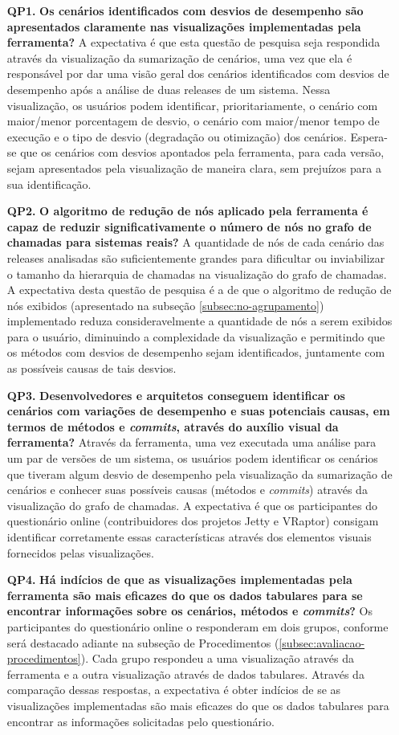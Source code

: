 \begin{itemize}
  \item[\textbf{QP1.}] \textbf{Os cenários identificados com desvios de desempenho são apresentados claramente nas visualizações implementadas pela ferramenta?} A expectativa é que esta questão de pesquisa seja respondida através da visualização da sumarização de cenários, uma vez que ela é responsável por dar uma visão geral dos cenários identificados com desvios de desempenho após a análise de duas releases de um sistema. Nessa visualização, os usuários podem identificar, prioritariamente, o cenário com maior/menor porcentagem de desvio, o cenário com maior/menor tempo de execução e o tipo de desvio (degradação ou otimização) dos cenários. Espera-se que os cenários com desvios apontados pela ferramenta, para cada versão, sejam apresentados pela visualização de maneira clara, sem prejuízos para a sua identificação.
  \item[\textbf{QP2.}] \textbf{O algoritmo de redução de nós aplicado pela ferramenta é capaz de reduzir significativamente o número de nós no grafo de chamadas para sistemas reais?} A quantidade de nós de cada cenário das releases analisadas são suficientemente grandes para dificultar ou inviabilizar o tamanho da hierarquia de chamadas na visualização do grafo de chamadas. A expectativa desta questão de pesquisa é a de que o algoritmo de redução de nós exibidos (apresentado na subseção \ref{subsec:no-agrupamento}) implementado reduza consideravelmente a quantidade de nós a serem exibidos para o usuário, diminuindo a complexidade da visualização e permitindo que os métodos com desvios de desempenho sejam identificados, juntamente com as possíveis causas de tais desvios. 
  \item[\textbf{QP3.}] \textbf{Desenvolvedores e arquitetos conseguem identificar os cenários com variações de desempenho e suas potenciais causas, em termos de métodos e \textit{commits}, através do auxílio visual da ferramenta?} Através da ferramenta, uma vez executada uma análise para um par de versões de um sistema, os usuários podem identificar os cenários que tiveram algum desvio de desempenho pela visualização da sumarização de cenários e conhecer suas possíveis causas (métodos e \textit{commits}) através da visualização do grafo de chamadas. A expectativa é que os participantes do questionário online (contribuidores dos projetos Jetty e VRaptor) consigam identificar corretamente essas características através dos elementos visuais fornecidos pelas visualizações.
  \item[\textbf{QP4.}] \textbf{Há indícios de que as visualizações implementadas pela ferramenta são mais eficazes do que os dados tabulares para se encontrar informações sobre os cenários, métodos e \textit{commits}?} Os participantes do questionário online o responderam em dois grupos, conforme será destacado adiante na subseção de Procedimentos (\ref{subsec:avaliacao-procedimentos}). Cada grupo respondeu a uma visualização através da ferramenta e a outra visualização através de dados tabulares. Através da comparação dessas respostas, a expectativa é obter indícios de se as visualizações implementadas são mais eficazes do que os dados tabulares para encontrar as informações solicitadas pelo questionário.

\end{itemize}
